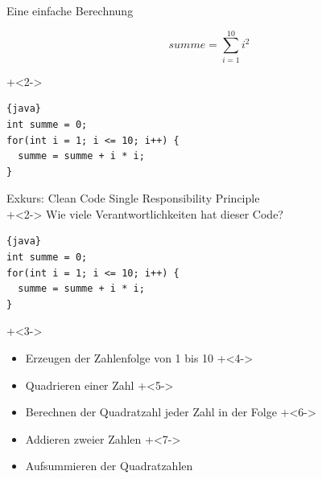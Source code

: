 \begin{frame}[fragile]{Eine einfache Berechnung}

\[
summe = \sum_{i=1}^{10}i^2
\]

\vspace{5em}

\onslide+<2->
\begin{lstlisting}{java}
int summe = 0;
for(int i = 1; i <= 10; i++) {
  summe = summe + i * i;
}
\end{lstlisting}
\end{frame}

\begin{frame}[fragile]{Exkurs: Clean Code}
Single Responsibility Principle
\\[2em]

\onslide+<2->
Wie viele Verantwortlichkeiten hat dieser Code?
\begin{lstlisting}{java}
int summe = 0;
for(int i = 1; i <= 10; i++) {
  summe = summe + i * i;
}
\end{lstlisting}

\onslide+<3->
\begin{itemize}
\item Erzeugen der Zahlenfolge von 1 bis 10
\onslide+<4->
\item Quadrieren einer Zahl
\onslide+<5->
\item Berechnen der Quadratzahl jeder Zahl in der Folge
\onslide+<6->
\item Addieren zweier Zahlen
\onslide+<7->
\item Aufsummieren der Quadratzahlen
\end{itemize}

\end{frame}

